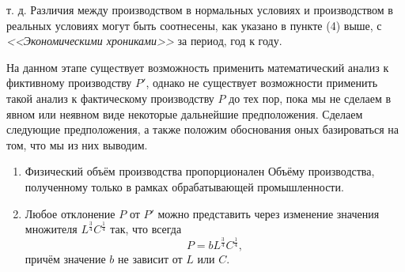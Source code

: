 \documentclass[leqno]{article}  %
\begin{document}
т. д. Различия между производством в нормальных условиях и производством в реальных условиях могут быть соотнесены, как указано в пункте (4) выше, с \emph{<<Экономическими хрониками>>} за период, год к году.
\par
На данном этапе существует возможность применить математический анализ к фиктивному производству \(P'\), однако не существует возможности применить такой анализ к фактическому производству \(P\) до тех пор, пока мы не сделаем в явном или неявном виде некоторые дальнейшие предположения. Сделаем следующие предположения, а также положим обоснования оных базироваться на том, что мы из них выводим.
\begin{enumerate}
\renewcommand{\theenumi}{\Asbuk{enumi}}
\renewcommand{\labelenumi}{(\theenumi)}
\item Физический объём производства пропорционален Объёму производства, полученному только в рамках обрабатывающей промышленности.
\item Любое отклонение \(P\) от \(P'\) можно представить через изменение значения множителя \(L^\frac{3}{4}C^\frac{1}{4}\) так, что всегда
\[P=bL^\frac{3}{4}C^\frac{1}{4},\]
причём значение \(b\) не зависит от \(L\) или \(C\).
\end{enumerate}
\end{document}
